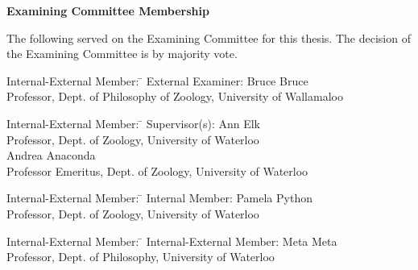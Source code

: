\cleardoublepage %
 
\begin{center}\textbf{Examining Committee Membership}\end{center}
  \noindent
The following served on the Examining Committee for this thesis. The decision of the Examining Committee is by majority vote.
  \bigskip
  
  \noindent
\begin{tabbing}
Internal-External Member: \=  \kill %
External Examiner: \>  Bruce Bruce \\ 
\> Professor, Dept. of Philosophy of Zoology, University of Wallamaloo \\
\end{tabbing} 
  \bigskip
  
  \noindent
\begin{tabbing}
Internal-External Member: \=  \kill %
Supervisor(s): \> Ann Elk \\
\> Professor, Dept. of Zoology, University of Waterloo \\
\> Andrea Anaconda \\
\> Professor Emeritus, Dept. of Zoology, University of Waterloo \\
\end{tabbing}
  \bigskip
  
  \noindent
  \begin{tabbing}
Internal-External Member: \=  \kill %
Internal Member: \> Pamela Python \\
\> Professor, Dept. of Zoology, University of Waterloo \\
\end{tabbing}
  \bigskip
  
  \noindent
\begin{tabbing}
Internal-External Member: \=  \kill %
Internal-External Member: \> Meta Meta \\
\> Professor, Dept. of Philosophy, University of Waterloo \\
\end{tabbing}
  \bigskip
  
